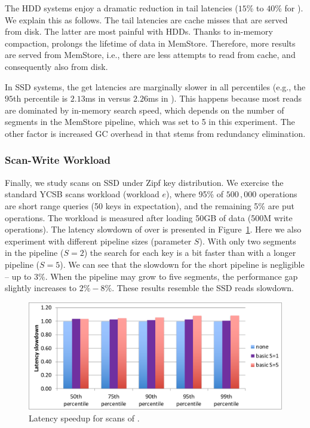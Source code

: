The HDD systems enjoy a dramatic reduction in tail latencies ($15$\% to $40$\% for \adp). 
We explain this as follows. The tail latencies are cache misses that are served from disk. 
The latter are most painful with HDDs. Thanks to in-memory compaction, \adp\/ prolongs 
the lifetime of data in MemStore. Therefore, more results are served from MemStore, i.e., 
there are less attempts to read from cache, and consequently also from disk.  

In SSD systems, the get latencies are marginally slower in all percentiles (e.g., the 
$95$th percentile is $2.13$ms in \none\/ versus $2.26$ms in \adp). This happens
because most reads are dominated by in-memory search speed, which depends on the 
number of segments in the MemStore pipeline, which was set to 5 in this experiment. 
The other factor
is increased GC overhead in \adp\/ that stems from redundancy elimination. 


\subsubsection{Scan-Write Workload}
Finally, we study  scans  on SSD under Zipf key distribution. We exercise  the standard YCSB scans workload (workload $e$), where 95\% of $500\,,000$ operations are short range queries (50 keys in expectation), and the remaining 5\% are put operations.  The workload is measured after loading 50GB of data (500M write operations). The latency slowdown of \basic\/ over \none\/ is presented in Figure~\ref{fig:scans}. Here we also experiment with different pipeline sizes (parameter $S$). With only two segments in the pipeline ($S=2$) the search for each key is a bit faster than with a longer pipeline ($S=5$). We can see that the slowdown for the short pipeline is negligible -- up to $3\%$. When the pipeline may grow to five segments, the performance gap slightly increases to $2\%-8\%$. These results resemble the SSD reads slowdown.

\begin{figure}[htb]
\includegraphics[width=\figw]{Figs/scans.pdf}
\caption{Latency speedup for scans of \basic.
}
\label{fig:scans}
\end{figure}



